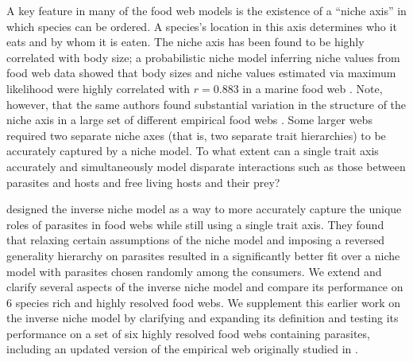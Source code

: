 \documentclass[/home/nkappler/Research/Dissertation/
 dissertation.tex]{subfiles}
\begin{document}
\begin{bibunit}
A key feature in many of the food web models is the existence of a ``niche
axis'' in which species can be ordered. A species's location in this axis
determines who it eats and by whom it is eaten. The niche axis has been found to be
highly correlated with body size; a probabilistic niche model inferring niche
values from food web data showed that body sizes and niche values estimated via
maximum likelihood were highly correlated with $r=0.883$ in a marine food web
\cite{Williams2010}. Note, however, that the same authors found substantial
variation in the structure of the niche axis in a large set of different
empirical food webs \cite{Williams2011}. Some larger webs required two separate
niche axes (that is, two separate trait hierarchies) to be accurately captured
by a niche model. To what extent can a single trait axis accurately and
simultaneously model disparate interactions such as those between parasites and
hosts and free living hosts and their prey?

\cite{Warren2010} designed the inverse niche model as a way to more accurately
capture the unique roles of parasites in food webs while still using a single
trait axis. They found that relaxing certain assumptions of the niche model and
imposing a reversed generality hierarchy on parasites resulted in a
significantly better fit over a niche model with parasites chosen randomly
among the consumers. We extend and clarify several aspects of the inverse niche
model and compare its performance on 6 species rich and highly resolved food
webs. We supplement this earlier work on the inverse niche model by clarifying
and expanding its definition and testing its performance on a set of six highly
resolved food webs containing parasites, including an updated version of the
empirical web originally studied in \cite{Warren2010}.


\end{bibunit}
\end{document}
